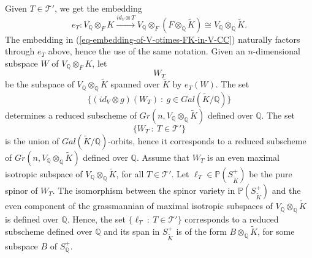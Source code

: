 \documentclass[12pt]{amsart}
\numberwithin{equation}{subsection}
\theoremstyle{plain}
\theoremstyle{definition}
\newcommand{\QQ}{{\mathbb Q}}
\newcommand{\T}{{\mathcal T}}
\newcommand{\PP}{{\mathbb P}}
\newcommand{\RightArrowOf}[1]{\stackrel{#1}{\rightarrow}}
\begin{document}
{Given $T\in \T'$,
we get the embedding
\[
e_T:V_\QQ\otimes_F K\RightArrowOf{id_V\otimes T} V_\QQ\otimes_F(F\otimes_\QQ\tilde{K})\cong V_\QQ\otimes_\QQ\tilde{K}.
\]
The embedding in (\ref{eq-embedding-of-V-otimes-FK-in-V-CC}) naturally factors through $e_T$ above, hence the use of the same notation. 
Given an $n$-dimensional subspace $W$ of $V_\QQ\otimes_F K$, 
let 
\[
W_T
\] 
be the subspace of $V_\QQ\otimes_\QQ\tilde{K}$ spanned over $\tilde{K}$ by $e_T(W)$. 
The set 
\[
\{
(id_V\otimes g)(W_T) \ : \ g \in Gal(\tilde{K}/\QQ)
\}
\]
determines a reduced subscheme of $Gr(n,V_\QQ\otimes_\QQ\tilde{K})$ defined over $\QQ$. 
The set
\[
\{W_T \ : \ T\in\T'\}
\]
is the union of $Gal(\tilde{K}/\QQ)$-orbits, hence it corresponds to a reduced subscheme of $Gr(n,V_\QQ\otimes_\QQ\tilde{K})$ defined over $\QQ$. 
Assume that $W_T$ is an even maximal isotropic subspace of $V_\QQ\otimes_\QQ\tilde{K}$, for all $T\in \T'$.
Let $\ell_T\in \PP(S^+_{\tilde{K}})$ be the pure spinor of $W_T$. 
The isomorphism between the spinor variety in $\PP(S^+_{\tilde{K}})$ and the even component of the grassmannian of maximal isotropic subspaces of $V_\QQ\otimes_\QQ\tilde{K}$ is defined over $\QQ$. Hence, the set
$\{\ell_T \ : \ T\in\T'\}$ corresponds to a reduced subscheme defined over $\QQ$ and its span in $S^+_{\tilde{K}}$ is of the form $B\otimes_\QQ\tilde{K}$,
for some subspace $B$ of $S^+_\QQ$.

% 
}
\end{document}
